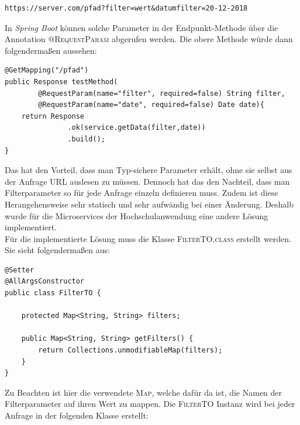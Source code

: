 \begin{lstlisting}[caption={Typischer Anfragepfad mit Filtern}]
https://server.com/pfad?filter=wert&datumfilter=20-12-2018
\end{lstlisting}

In \textit{Spring Boot} können solche Parameter in der Endpunkt-Methode über die Annotation \textsc{@RequestParam} abgerufen werden. Die obere Methode würde dann folgendermaßen aussehen:

\begin{lstlisting}[caption={Typischer Endpunkt mit @RequestParam}]
@GetMapping("/pfad")
public Response testMethod(
        @RequestParam(name="filter", required=false) String filter, 
        @RequestParam(name="date", required=false) Date date){
	return Response
	           .ok(service.getData(filter,date))
	           .build();
}
\end{lstlisting}

Das hat den Vorteil, dass man Typ-sichere Parameter erhält, ohne sie selbst aus der Anfrage \ac{URL} auslesen zu müssen. Dennoch hat das den Nachteil, dass man Filterparameter so für jede Anfrage einzeln definieren muss. Zudem ist diese Herangehensweise sehr statisch und sehr aufwändig bei einer Änderung. Deshalb wurde für die Microservices der Hochschulanwendung eine andere Lösung implementiert.\\
\linebreak
Für die implementierte Lösung muss die Klasse \textsc{FilterTO.class} erstellt werden. Sie sieht folgendermaßen aus:

\begin{lstlisting}[caption={Aufbau des Filter Objekts}]
@Setter
@AllArgsConstructor
public class FilterTO {

    protected Map<String, String> filters;

    public Map<String, String> getFilters() {
        return Collections.unmodifiableMap(filters);
    }
}
\end{lstlisting}

Zu Beachten ist hier die verwendete \textsc{Map}, welche dafür da ist, die Namen der Filterparameter auf ihren Wert zu mappen. Die \textsc{FilterTO} Instanz wird bei jeder Anfrage in der folgenden Klasse erstellt:

